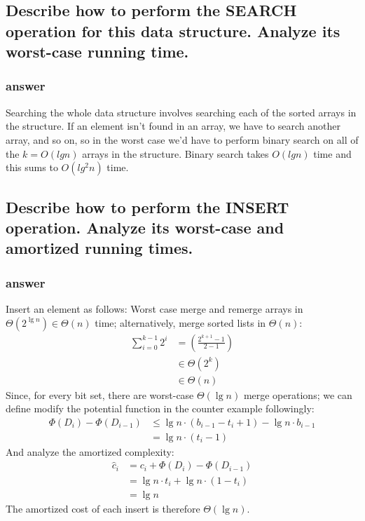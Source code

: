 \documentclass[titlepage]{article}\usepackage[]{graphicx}\usepackage[]{color}
\begin{document}
  \subsection{Describe how to perform the SEARCH operation for this data structure.
	Analyze its worst-case running time.}
	\subsubsection{answer}
	Searching the whole data structure involves searching each of the sorted
	arrays in the structure. If an element isn't found in an array, we have to
	search another array, and so on, so in the worst case we'd have to perform
	binary search on all of the $k = O(lg n) $ arrays in the structure. Binary search takes $O(lg n)$ time and this sums to $O(lg^2 n)$ time. 



	\subsection{Describe how to perform the INSERT operation. Analyze its
	worst-case and amortized running times.  }
	\subsubsection{answer}

Insert an element as follows:
  Worst case merge and remerge arrays in $\Theta(2^{\lg n}) \in \Theta(n)$ time; alternatively, merge sorted lists in $\Theta(n)$:
  \begin{align}
    \sum_{i=0}^{k-1}2^i &= \left(\frac{2^{k+1} - 1}{2-1}\right)\\
    &\in \Theta(2^k)\\
    &\in \Theta(n)
  \end{align}
  Since, for every bit set, there are worst-case $\Theta(\lg n)$ merge
  operations; we can define modify the potential function in the
  counter example followingly:
  \begin{align}
    \Phi(D_i)-\Phi(D_{i-1}) &\leq \lg n\cdot(b_{i-1}-t_i+1) - \lg n\cdot b_{i-1}\\
    &= \lg n\cdot(t_i - 1)
  \end{align}
  And analyze the amortized complexity:
  \begin{align}
    \hat{c}_i &= c_i + \Phi(D_i) - \Phi(D_{i-1})\\
    &= \lg n \cdot t_i + \lg n\cdot(1 - t_i)\\
    &= \lg n
  \end{align}
  The amortized cost of each insert is therefore $\Theta(\lg n)$.
\end{document}
